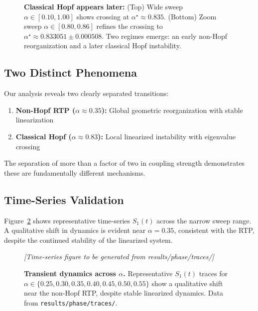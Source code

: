 \documentclass[11pt,twocolumn]{article}
\begin{document}
\begin{figure}[t]
  \centering
  
  \vspace{0.4em}
  
  \caption{%
  \textbf{Classical Hopf appears later:} (Top) Wide sweep $\alpha\in[0.10,1.00]$ shows crossing
  at $\alpha^\star\approx0.835$. (Bottom) Zoom sweep $\alpha\in[0.80,0.86]$ refines the crossing
  to $\alpha^\star\approx0.833051\pm0.000508$. Two regimes emerge: an early non-Hopf reorganization
  and a later classical Hopf instability.
  }
  \label{fig:eigs-wide-zoom}
\end{figure}

\subsection{Two Distinct Phenomena}

Our analysis reveals two clearly separated transitions:

\begin{enumerate}
  \item \textbf{Non-Hopf RTP ($\alpha \approx 0.35$):} Global geometric reorganization with stable linearization
  \item \textbf{Classical Hopf ($\alpha \approx 0.83$):} Local linearized instability with eigenvalue crossing
\end{enumerate}

The separation of more than a factor of two in coupling strength demonstrates these are fundamentally different
mechanisms.

\subsection{Time-Series Validation}

Figure~\ref{fig:s1-traces} shows representative time-series $S_1(t)$ across the narrow sweep range. A qualitative
shift in dynamics is evident near $\alpha = 0.35$, consistent with the RTP, despite the continued stability of
the linearized system.

\begin{figure}[t]
  \centering
  \begin{center}
  \textit{[Time-series figure to be generated from results/phase/traces/]}
  \end{center}
  \caption{%
  \textbf{Transient dynamics across $\alpha$.} Representative $S_1(t)$ traces for
  $\alpha\in\{0.25,0.30,0.35,0.40,0.45,0.50,0.55\}$ show a qualitative shift near the non-Hopf RTP,
  despite stable linearized dynamics. Data from \texttt{results/phase/traces/}.
  }
  \label{fig:s1-traces}
\end{figure}
\end{document}
